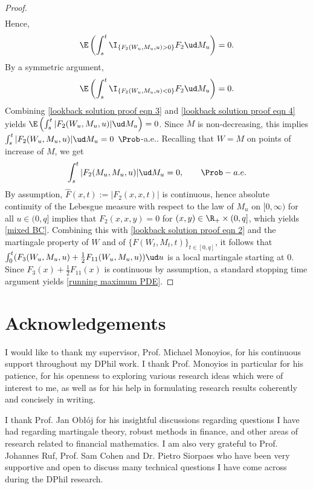 \documentclass[11pt]{article}
\begin{document}
\begin{proof}
\begin{align*}
\end{align*}
Hence,
\begin{equation}
\label{lookback solution proof eqn 3}
\E \left( \int_s^t \I_{\{ F_2(W_u, M_u, u) > 0 \}} F_2 \ud M_u \right) = 0.
\end{equation}
By a symmetric argument,
\begin{equation}
\label{lookback solution proof eqn 4}
\E \left( \int_s^t \I_{\{ F_2(W_u, M_u, u) < 0 \}} F_2 \ud M_u \right) = 0.
\end{equation}
Combining \eqref{lookback solution proof eqn 3} and \eqref{lookback solution proof eqn 4} yields $\E \left( \int_s^t  | F_2(W_u, M_u, u) | \ud M_u \right) = 0$. Since $M$ is non-decreasing, this implies $\int_s^t  | F_2(W_u, M_u, u) | \ud M_u = 0$ $\Prob$-a.e.. Recalling that $W = M$ on points of increase of $M$, we get 
\begin{equation}
\label{lookback solution proof eqn 5}
\int_s^t  | F_2(M_u, M_u, u) | \ud M_u = 0, \quad \quad \Prob-a.e.
\end{equation}
By assumption, $\widehat{F}(x,t) := |F_2(x,x,t)|$ is continuous, hence absolute continuity of the Lebesgue measure with respect to the law of $M_u$ on $[0,\infty)$ for all $u \in (0,q]$ implies that $F_2(x,x,y) = 0$ for $(x,y) \in \R_+ \times (0,q]$, which yields \eqref{mixed BC}. Combining this with \eqref{lookback solution proof eqn 2} and the martingale property of $W$ and of $\{ F(W_t,M_t,t) \}_{t \in [0,q]}$, it follows that $\int_0^t ( F_3(W_u, M_u, u) + \frac{1}{2} F_{11}(W_u, M_u, u) ) \ud u$ is a local martingale starting at $0$. Since $F_3(x) +\frac{1}{2} F_{11}(x)$ is
continuous by assumption, a standard stopping time argument yields \eqref{running maximum PDE}.

\end{proof}

\section*{Acknowledgements}

I would like to thank my supervisor, Prof. Michael Monoyios, for his continuous support throughout my DPhil work. I thank Prof. Monoyios in particular for his patience, for his openness to exploring various research ideas which were of interest to me, as well as for his help in formulating research results coherently and concisely in writing.

I thank Prof. Jan Ob\l\'oj for his insightful discussions regarding questions I have had regarding martingale theory, robust methods in finance, and other areas of research related to financial mathematics. I am also very grateful to Prof. Johannes Ruf, Prof. Sam Cohen and Dr. Pietro Siorpaes who have been very supportive and open to discuss many technical questions I have come across during the DPhil research.
\end{document}
